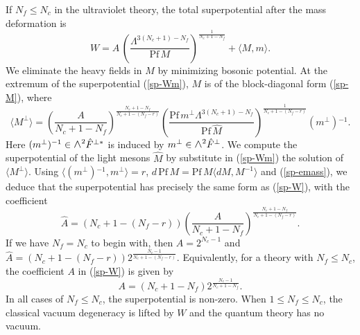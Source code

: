 \documentclass[lecture]{qft-l}
\newcommand{\Lam}{\varLambda}
\newcommand{\medwedge}{\mbox{\fontsize{12pt}{0pt}\selectfont $\wedge$}}
\newcommand{\bra}{\langle}
\newcommand{\ket}{\rangle}
\newcommand{\inv}[1]{\frac{1}{#1}}
\newcommand{\dr}{d}
\newcommand{\Pf}{\mathrm{Pf\,}}
\newcommand{\hF}{\hat{F}{}}
\newcommand{\hM}{\hat{M}{}}
\newcommand{\Mperp}{\bra M^\perp\ket}
\begin{document}
If $N_f\le N_c$ in the ultraviolet theory, the total superpotential after
the mass deformation is
	\begin{equation}\label{sp-Wm}
W=A\,\left(\frac{\Lam^{3(N_c+1)-N_f}}{\Pf M}\right)^{\inv{N_c+1-N_f}}
+\bra M,m\ket.
	\end{equation}
We eliminate the heavy fields in $M$ by minimizing bosonic potential.
At the extremum of the superpotential (\ref{sp-Wm}), $M$ is of the 
block-diagonal form (\ref{sp-M}), where
	\begin{equation}\label{sp-perp}
\Mperp=\left(\frac{A}{N_c+1-N_f}\right)^{\frac{N_c+1-N_f}{N_c+1-(N_f-r)}}
\left(\frac{\Pf m^\perp\Lam^{3(N_c+1)-N_f}}{\Pf\hM}\right)
^{\inv{N_c+1-(N_f-r)}}(m^\perp){}^{-1}.
	\end{equation}
Here $(m^\perp){}^{-1}\in\medwedge^2\hF^{\perp *}$ is induced by 
$m^\perp\in\medwedge^2\hF^\perp$.
We compute the superpotential of the light mesons $\hM$ by
substitute in (\ref{sp-Wm}) the solution of $\Mperp$.
Using $\bra(m^\perp){}^{-1},m^\perp\ket=r$, 
$\dr\,\Pf M=\Pf M\bra\dr M,M^{-1}\ket$ and (\ref{sp-emass}), 
we deduce that the superpotential has precisely the same form as (\ref{sp-W}), 
with the coefficient 
	\begin{equation}\label{sp-decouple}
\hat{A}=(N_c+1-(N_f-r))
\left(\frac{A}{N_c+1-N_f}\right)^{\frac{N_c+1-N_f}{N_c+1-(N_f-r)}}.
	\end{equation}
If we have $N_f=N_c$ to begin with, then $A=2^{N_c-1}$ and
$\hat{A}=(N_c+1-(N_f-r))2^{\frac{N_c-1}{N_c+1-(N_f-r)}}$.
Equivalently, for a theory with $N_f\le N_c$, the coefficient $A$ 
in (\ref{sp-W}) is given by
	\begin{equation}\label{sp-A}
A=(N_c+1-N_f)2^{\frac{N_c-1}{N_c+1-N_f}}.
	\end{equation}
In all cases of $N_f\le N_c$, the superpotential is non-zero.
When $1\le N_f\le N_c$, the classical vacuum degeneracy is lifted by $W$
and the quantum theory has no vacuum.
\end{document}
